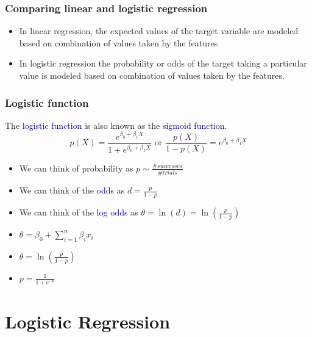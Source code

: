 \documentclass[table,dvipsnames]{beamer}
\newcommand{\keywd}{\textcolor{myorange}}
\newcommand{\highlt}{\textcolor{darkblue}}
\begin{document}
\begin{frame}
\frametitle{Comparing linear and logistic regression}

\begin{block}{}
\begin{itemize}
 \item  In \keywd{linear regression}, the expected values of the target variable are modeled based on combination of values taken by the features
 \item  In \keywd{logistic regression} the probability or odds of the target taking a particular value is modeled based on combination of values taken by the features. 
\end{itemize}
\end{block}
\end{frame}

\begin{frame}
\frametitle{Logistic function}

The \highlt{logistic function} is also known as the \highlt{sigmoid function}.
\begin{equation}
 p(X) = \frac{e^{\beta_{0} + \beta_{1} X}}{1 + e^{\beta_{0} + \beta_{1} X}} \textrm{ or }
 \frac{p(X)}{1-p(X)} = e^{\beta_{0} + \beta_{1} X}  
\end{equation}

\begin{itemize}
 \item We can think of  probability as $p \sim \frac{\#successes}{\#trials}$
 \item We can think of the \highlt{odds} as $d = \frac{p}{1-p}$ 
 \item We can think of the \highlt{log odds} as $\theta = \ln(d) = \ln(\frac{p}{1-p})$
 \item $\theta= \beta_{0} + \sum_{i=1}^{n}\beta_{i}x_{i}$
 \item $\theta = \ln(\frac{p}{1-p})$
 \item $p = \frac{1}{1+e^{-\theta}}$
 \end{itemize}
\end{frame}

\section{Logistic Regression}
\subsection{}
\end{document}
